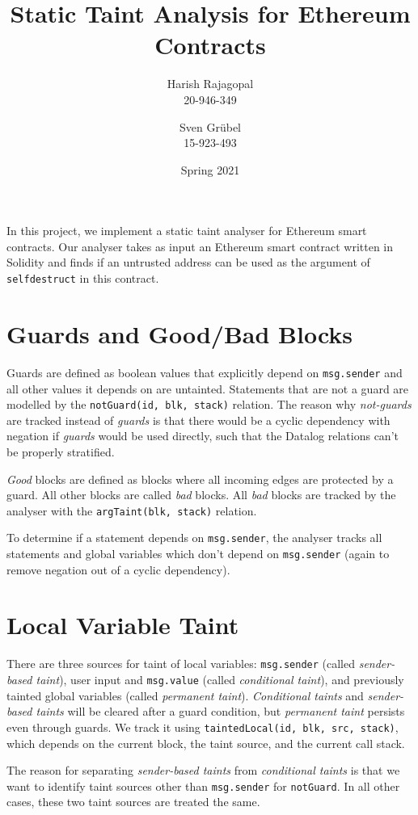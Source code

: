 \documentclass[10pt]{article}
\title{%
    \vspace{-15mm}
    Static Taint Analysis for Ethereum Contracts\\
}
\author{
    Harish Rajagopal\\
    20-946-349%
    \and%
    Sven Grübel\\
    15-923-493%
}
\date{Spring 2021}
\newcommand{\solidity}[1]{\texttt{#1}}
\begin{document}
\maketitle

In this project, we implement a static taint analyser for Ethereum smart contracts.
Our analyser takes as input an Ethereum smart contract written in Solidity and finds if an untrusted address can be used as the argument of \solidity{selfdestruct} in this contract.

\section{Guards and Good/Bad Blocks}
Guards are defined as boolean values that explicitly depend on \solidity{msg.sender} and all other values it depends on are untainted.
Statements that are not a guard are modelled by the \texttt{notGuard(id, blk, stack)} relation.
The reason why \textit{not-guards} are tracked instead of \textit{guards} is that there would be a cyclic dependency with negation if \textit{guards} would be used directly, such that the Datalog relations can't be properly stratified.

\textit{Good} blocks are defined as blocks where all incoming edges are protected by a guard.
All other blocks are called \textit{bad} blocks.
All \textit{bad} blocks are tracked by the analyser with the \texttt{argTaint(blk, stack)} relation.

To determine if a statement depends on \solidity{msg.sender}, the analyser tracks all statements and global variables which don't depend on \solidity{msg.sender} (again to remove negation out of a cyclic dependency).

\section{Local Variable Taint}
There are three sources for taint of local variables: \solidity{msg.sender} (called \textit{sender-based taint}), user input and \solidity{msg.value} (called \textit{conditional taint}), and previously tainted global variables (called \textit{permanent taint}).
\textit{Conditional taints} and \textit{sender-based taints} will be cleared after a guard condition, but \textit{permanent taint} persists even through guards.
We track it using \texttt{taintedLocal(id, blk, src, stack)}, which depends on the current block, the taint source, and the current call stack.

The reason for separating \textit{sender-based taints} from \textit{conditional taints} is that we want to identify taint sources other than \solidity{msg.sender} for \texttt{notGuard}.
In all other cases, these two taint sources are treated the same.
\end{document}
